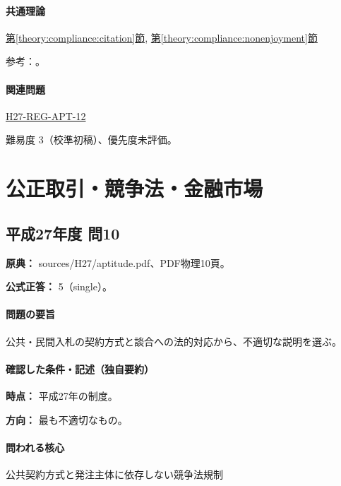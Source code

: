 \paragraph{共通理論} \hyperref[theory:compliance:citation]{第\ref*{theory:compliance:citation}節}, \hyperref[theory:compliance:nonenjoyment]{第\ref*{theory:compliance:nonenjoyment}節}

\par 参考：\cite{bunka_citation_faq,bunka_amend2018,bunka_ai2024,bunka_text2026}。

\paragraph{関連問題} \hyperref[q:h27-reg-apt-12]{H27-REG-APT-12}

\par 難易度 3（校準初稿）、優先度未評価。

\section{公正取引・競争法・金融市場}

\subsection{平成27年度 問10}
\label{q:h27-reg-apt-10}

\noindent\textbf{原典：} sources/H27/aptitude.pdf、PDF物理10頁。

\textbf{公式正答：} 5（single）。

\paragraph{問題の要旨} 公共・民間入札の契約方式と談合への法的対応から、不適切な説明を選ぶ。

\paragraph{確認した条件・記述（独自要約）}\mbox{}\par

\noindent\textbf{時点：} 平成27年の制度。\par

\noindent\textbf{方向：} 最も不適切なもの。\par

\paragraph{問われる核心} 公共契約方式と発注主体に依存しない競争法規制

